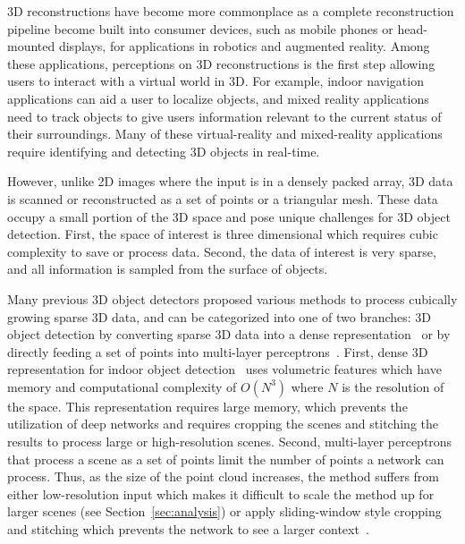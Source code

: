 \documentclass[runningheads]{llncs}
\begin{document}
3D reconstructions have become more commonplace as a complete reconstruction pipeline become built into consumer devices, such as mobile phones or head-mounted displays, for applications in robotics and augmented reality. Among these applications, perceptions on 3D reconstructions is the first step allowing users to interact with a virtual world in 3D. For example, indoor navigation applications can aid a user to localize objects, and mixed reality applications need to track objects to give users information relevant to the current status of their surroundings.
Many of these virtual-reality and mixed-reality applications require identifying and detecting 3D objects in real-time.











However, unlike 2D images where the input is in a densely packed array, 3D data is scanned or reconstructed as a set of points or a triangular mesh. These data occupy a small portion of the 3D space and pose unique challenges for 3D object detection. First, the space of interest is three dimensional which requires cubic complexity to save or process data. Second, the data of interest is very sparse, and all information is sampled from the surface of objects. 





Many previous 3D object detectors proposed various methods to process cubically growing sparse 3D data, and can be categorized into one of two branches: 3D object detection by converting sparse 3D data into a dense representation~\cite{maturana_iros_2015,DeepSlidingShapes,armeni_cvpr16,li2016vehicle,hou20193d} or by directly feeding a set of points into multi-layer perceptrons~\cite{qi2019deep,yang2019learning}. First, dense 3D representation for indoor object detection~\cite{DeepSlidingShapes,armeni_cvpr16,hou20193d} uses volumetric features which have memory and computational complexity of $O(N^3)$ where $N$ is the resolution of the space. This representation requires large memory, which prevents the utilization of deep networks and requires cropping the scenes and stitching the results to process large or high-resolution scenes. Second, multi-layer perceptrons that process a scene as a set of points limit the number of points a network can process. Thus, as the size of the point cloud increases, the method suffers from either low-resolution input which makes it difficult to scale the method up for larger scenes (see Section~\ref{sec:analysis}) or apply sliding-window style cropping and stitching which prevents the network to see a larger context~\cite{yang2019learning}.
\end{document}
